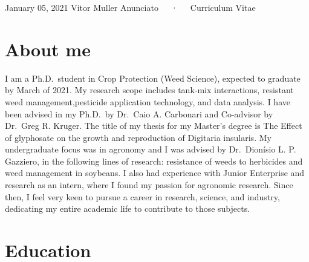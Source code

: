 \documentclass[11pt, a4paper]{awesome-cv}
\begin{document}
\makecvheader

\makecvfooter
  {January 05, 2021}
    {Vitor Muller Anunciato~~~·~~~Curriculum Vitae}
  {\thepage}





\hypertarget{about-me}{%
\section{About me}\label{about-me}}

I am a Ph.D.~student in Crop Protection (Weed Science), expected to
graduate by March of 2021. My research scope includes tank‑mix
interactions, resistant weed management,pesticide application
technology, and data analysis. I have been advised in my Ph.D.~by
Dr.~Caio A. Carbonari and Co‑advisor by Dr.~Greg R. Kruger. The title of
my thesis for my Master's degree is The Effect of glyphosate on the
growth and reproduction of Digitaria insularis. My undergraduate focus
was in agronomy and I was advised by Dr.~Dionísio L. P. Gazziero, in the
following lines of research: resistance of weeds to herbicides and weed
management in soybeans. I also had experience with Junior Enterprise and
research as an intern, where I found my passion for agronomic research.
Since then, I feel very keen to pursue a career in research, science,
and industry, dedicating my entire academic life to contribute to those
subjects.

\hypertarget{education}{%
\section{Education}\label{education}}
\end{document}
